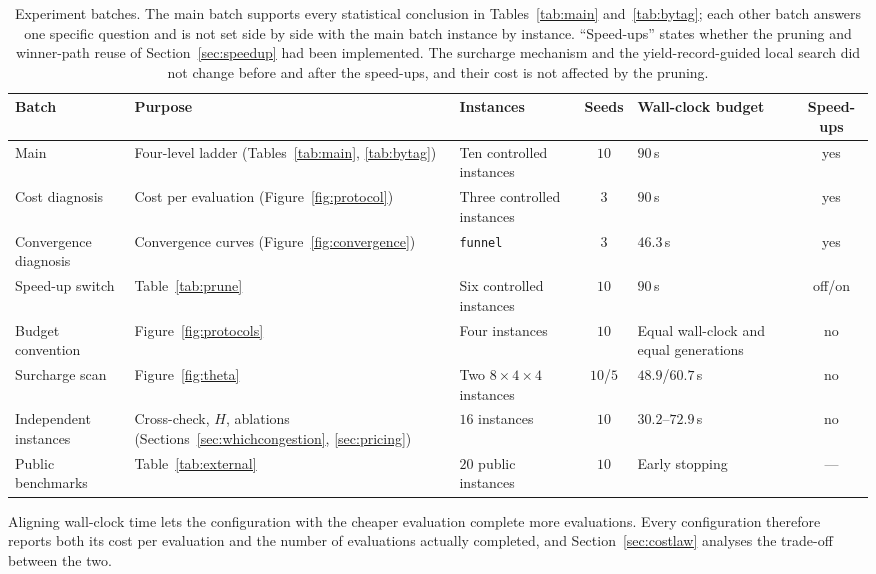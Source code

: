 \documentclass[manuscript,screen,review]{acmart}
\newcommand{\NSeeds}{10}
\newcommand{\MatrixCells}{16}
\newcommand{\PubNInst}{20}
\begin{document}
\begin{table}[t]
\caption{Experiment batches. The main batch supports every statistical conclusion in Tables~\ref{tab:main} and~\ref{tab:bytag}; each other batch answers one specific question and is not set side by side with the main batch instance by instance.
``Speed-ups'' states whether the pruning and winner-path reuse of Section~\ref{sec:speedup} had been implemented. The surcharge mechanism and the yield-record-guided local search did not change before and after the speed-ups, and their cost is not affected by the pruning.}
\label{tab:batches}
\footnotesize
\begin{tabular}{@{}p{1.7cm}p{2.3cm}p{1.9cm}cp{1.6cm}c@{}}
\toprule
Batch & Purpose & Instances & Seeds & Wall-clock budget & Speed-ups \\
\midrule
Main & Four-level ladder (Tables~\ref{tab:main}, \ref{tab:bytag}) & Ten controlled instances & $\NSeeds$ & $90$\,s & yes \\
Cost diagnosis & Cost per evaluation (Figure~\ref{fig:protocol}) & Three controlled instances & $3$ & $90$\,s & yes \\
Convergence diagnosis & Convergence curves (Figure~\ref{fig:convergence}) & \texttt{funnel} & $3$ & $46.3$\,s & yes \\
Speed-up switch & Table~\ref{tab:prune} & Six controlled instances & $10$ & $90$\,s & off/on \\
Budget convention & Figure~\ref{fig:protocols} & Four instances & $10$ & Equal wall-clock and equal generations & no \\
Surcharge scan & Figure~\ref{fig:theta} & Two $8\times4\times4$ instances & $10$/$5$ & $48.9$/$60.7$\,s & no \\
Independent instances & Cross-check, $H$, ablations (Sections~\ref{sec:whichcongestion}, \ref{sec:pricing}) & $\MatrixCells$ instances & $10$ & $30.2$--$72.9$\,s & no \\
Public benchmarks & Table~\ref{tab:external} & $\PubNInst$ public instances & $\NSeeds$ & Early stopping & --- \\
\bottomrule
\end{tabular}
\end{table}

Aligning wall-clock time lets the configuration with the cheaper evaluation complete more evaluations.
Every configuration therefore reports both its cost per evaluation and the number of evaluations actually completed, and Section~\ref{sec:costlaw} analyses the trade-off between the two.
\end{document}
